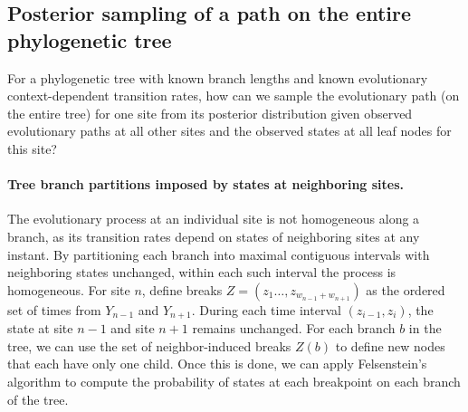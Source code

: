 \documentclass[11pt]{article}
\begin{document}


\subsection{Posterior sampling of a path on the entire phylogenetic tree}

For a phylogenetic tree with known branch lengths and known
evolutionary context-dependent transition rates, how can we sample the
evolutionary path (on the entire tree) for one site from its posterior
distribution given observed evolutionary paths at all other sites and the
observed states at all leaf nodes for this site?

\paragraph{Tree branch partitions imposed by states at neighboring sites.}
The evolutionary process at an individual site is not homogeneous along a branch, as
its transition rates depend on states of neighboring sites at any
instant. By partitioning each branch into maximal contiguous intervals
with neighboring states unchanged, within each such interval the
process is homogeneous. For site $n$, define breaks $Z =
(z_1\ldots,z_{w_{n-1} + w_{n+1}})$ as the ordered set of times from
$Y_{n-1}$ and $Y_{n+1}$. During each time interval $(z_{i-1}, z_{i})$,
the state at site $n-1$ and site $n+1$ remains unchanged.  For each
branch $b$ in the tree, we can use the set of neighbor-induced breaks
$Z(b)$ to define new nodes that each have only one child. Once this is
done, we can apply Felsenstein's algorithm to compute the probability
of states at each breakpoint on each branch of the tree.
\end{document}
